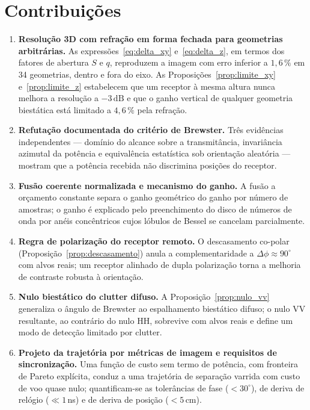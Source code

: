 \documentclass[12pt,a4paper,oneside]{book}
\theoremstyle{remark}
\newcommand{\dB}{\,\mathrm{dB}}
\theoremstyle{plain}
\theoremstyle{definition}
\begin{document}
\section{Contribuições}
\label{sec:concl_contrib}

\begin{enumerate}
  \item \textbf{Resolução 3D com refração em forma fechada para geometrias
  arbitrárias.} As expressões~\eqref{eq:delta_xy} e~\eqref{eq:delta_z}, em termos
  dos fatores de abertura $S$ e $q$, reproduzem a imagem com erro inferior a
  $1,6\,\%$ em 34 geometrias, dentro e fora do eixo. As
  Proposições~\ref{prop:limite_xy} e~\ref{prop:limite_z} estabelecem que um receptor
  à mesma altura nunca melhora a resolução a $-3\dB$ e que o ganho vertical de
  qualquer geometria biestática está limitado a $4,6\,\%$ pela refração.

  \item \textbf{Refutação documentada do critério de Brewster.} Três evidências
  independentes --- domínio do alcance sobre a transmitância, invariância azimutal
  da potência e equivalência estatística sob orientação aleatória --- mostram que a
  potência recebida não discrimina posições do receptor.

  \item \textbf{Fusão coerente normalizada e mecanismo do ganho.} A fusão a
  orçamento constante separa o ganho geométrico do ganho por número de amostras; o
  ganho é explicado pelo preenchimento do disco de números de onda por anéis
  concêntricos cujos lóbulos de Bessel se cancelam parcialmente.

  \item \textbf{Regra de polarização do receptor remoto.} O descasamento co-polar
  (Proposição~\ref{prop:descasamento}) anula a complementaridade a
  $\Delta\phi\approx90^\circ$ com alvos reais; um receptor alinhado de dupla
  polarização torna a melhoria de contraste robusta à orientação.

  \item \textbf{Nulo biestático do clutter difuso.} A
  Proposição~\ref{prop:nulo_vv} generaliza o ângulo de Brewster ao espalhamento
  biestático difuso; o nulo VV resultante, ao contrário do nulo HH, sobrevive com
  alvos reais e define um modo de detecção limitado por clutter.

  \item \textbf{Projeto da trajetória por métricas de imagem e requisitos de
  sincronização.} Uma função de custo sem termo de potência, com fronteira de Pareto
  explícita, conduz a uma trajetória de separação varrida com custo de voo quase
  nulo; quantificam-se as tolerâncias de fase ($<30^\circ$), de deriva de relógio
  ($\ll1\,$ns) e de deriva de posição ($<5\,$cm).


\end{enumerate}
\end{document}
